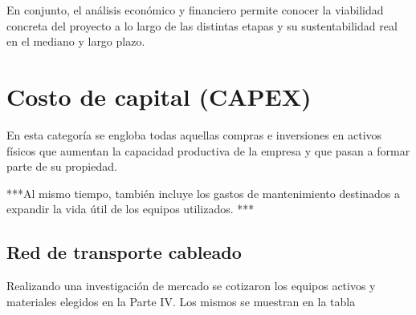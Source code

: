 \documentclass[11pt,a4paper]{article}
\begin{document}
En conjunto, el análisis económico y financiero permite conocer la viabilidad concreta del proyecto a lo largo de las distintas etapas y su sustentabilidad real en el mediano y largo plazo. 

\section{Costo de capital (CAPEX)}

 En esta categoría se engloba todas aquellas compras e inversiones en activos físicos que aumentan la capacidad productiva de la empresa y que pasan a formar parte de su propiedad.

***Al mismo tiempo, también incluye los gastos de mantenimiento destinados a expandir la vida útil de los equipos utilizados. ***

\subsection{Red de transporte cableado}

Realizando una investigación de mercado se cotizaron los equipos activos y materiales elegidos en la Parte IV. Los mismos se muestran en la tabla
\end{document}
